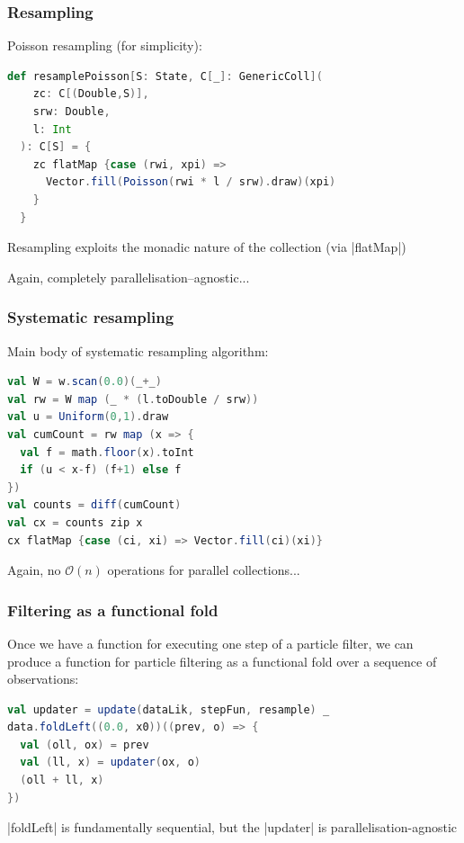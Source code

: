\documentclass[mathserif,handout]{beamer}
\begin{document}
\begin{frame}[fragile]
\frametitle{Resampling}
Poisson resampling (for simplicity):
\begin{lstlisting}[language=scala]
def resamplePoisson[S: State, C[_]: GenericColl](
    zc: C[(Double,S)],
    srw: Double,
    l: Int
  ): C[S] = {
    zc flatMap {case (rwi, xpi) =>
      Vector.fill(Poisson(rwi * l / srw).draw)(xpi)
    }
  }
\end{lstlisting}
Resampling exploits the monadic nature of the collection (via |flatMap|)

Again, completely parallelisation--agnostic...
\end{frame}

\begin{frame}[fragile]
  \frametitle{Systematic resampling}
  Main body of systematic resampling algorithm:
\begin{lstlisting}[language=scala]
val W = w.scan(0.0)(_+_)
val rw = W map (_ * (l.toDouble / srw))
val u = Uniform(0,1).draw
val cumCount = rw map (x => {
  val f = math.floor(x).toInt
  if (u < x-f) (f+1) else f
})
val counts = diff(cumCount)
val cx = counts zip x
cx flatMap {case (ci, xi) => Vector.fill(ci)(xi)}
\end{lstlisting}
Again, no $\mathcal{O}(n)$ operations for parallel collections...
\end{frame}



\begin{frame}[fragile]
  \frametitle{Filtering as a functional fold}
 Once we have a function for executing one step of a particle filter, we can produce a function for particle filtering as a functional fold over a sequence of observations:
\begin{lstlisting}[language=scala]
val updater = update(dataLik, stepFun, resample) _
data.foldLeft((0.0, x0))((prev, o) => {
  val (oll, ox) = prev
  val (ll, x) = updater(ox, o)
  (oll + ll, x)
})
\end{lstlisting}
|foldLeft| is fundamentally sequential, but the |updater| is parallelisation-agnostic
\end{frame}
\end{document}
